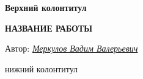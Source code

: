 \begin{titlepage}
  \clearpage\thispagestyle{empty}
  \centering

  \textbf{Верхний колонтитул}
  \vspace{33ex}

  {\LARGE\textbf{НАЗВАНИЕ РАБОТЫ}}
  \vfill

  \begin{flushright}
    \noindent
    Автор: \href{https://t.me/merkulovvvadim}{\textit{Меркулов Вадим Валерьевич}}
  \end{flushright}

  \vfill
  нижний колонтитул
  \pagebreak
\end{titlepage}